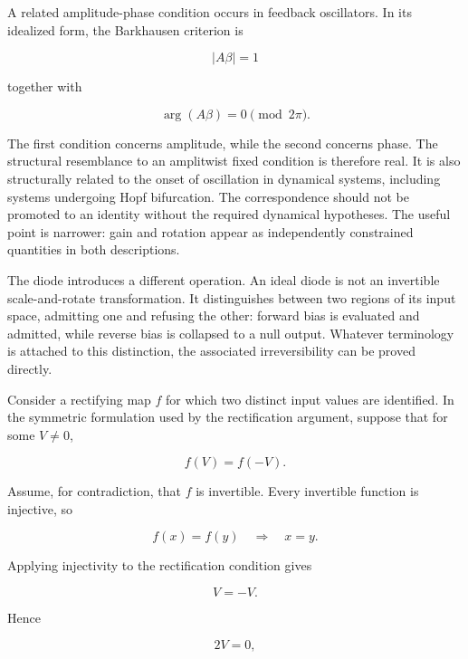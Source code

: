 \documentclass[11pt]{article}
\begin{document}
A related amplitude-phase condition occurs in feedback oscillators. In its idealized form, the Barkhausen criterion \citep{SedraSmith2015} is

\begin{equation}
|A\beta|=1
\end{equation}

together with

\begin{equation}
\arg(A\beta)=0
\pmod{2\pi}.
\end{equation}

The first condition concerns amplitude, while the second concerns phase. The structural resemblance to an amplitwist fixed condition is therefore real. It is also structurally related to the onset of oscillation in dynamical systems, including systems undergoing Hopf bifurcation. The correspondence should not be promoted to an identity without the required dynamical hypotheses. The useful point is narrower: gain and rotation appear as independently constrained quantities in both descriptions.

The diode introduces a different operation. An ideal diode is not an invertible scale-and-rotate transformation. It distinguishes between two regions of its input space, admitting one and refusing the other: forward bias is evaluated and admitted, while reverse bias is collapsed to a null output. Whatever terminology is attached to this distinction, the associated irreversibility can be proved directly.

Consider a rectifying map $f$ for which two distinct input values are identified. In the symmetric formulation used by the rectification argument, suppose that for some $V\neq0$,

\begin{equation}
f(V)=f(-V).
\end{equation}

Assume, for contradiction, that $f$ is invertible. Every invertible function is injective, so

\begin{equation}
f(x)=f(y)
\quad\Longrightarrow\quad
x=y.
\end{equation}

Applying injectivity to the rectification condition gives

\begin{equation}
V=-V.
\end{equation}

Hence

\begin{equation}
2V=0,
\end{equation}
\end{document}
